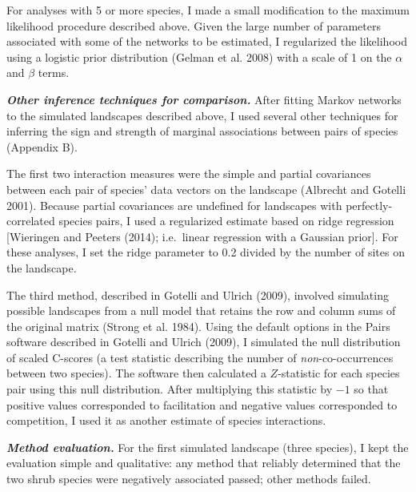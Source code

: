 \documentclass[12pt,]{article}
\begin{document}
\begin{spacing}{1.9}
\begin{flushleft}
For analyses with 5 or more species, I made a small modification to the
maximum likelihood procedure described above. Given the large number of
parameters associated with some of the networks to be estimated, I
regularized the likelihood using a logistic prior distribution (Gelman
et al. 2008) with a scale of 1 on the \(\alpha\) and \(\beta\) terms.

\textbf{\emph{Other inference techniques for comparison.}} After fitting
Markov networks to the simulated landscapes described above, I used
several other techniques for inferring the sign and strength of marginal
associations between pairs of species (Appendix B).

The first two interaction measures were the simple and partial
covariances between each pair of species' data vectors on the landscape
(Albrecht and Gotelli 2001). Because partial covariances are undefined
for landscapes with perfectly-correlated species pairs, I used a
regularized estimate based on ridge regression {[}Wieringen and Peeters
(2014); i.e.~linear regression with a Gaussian prior{]}. For these
analyses, I set the ridge parameter to 0.2 divided by the number of
sites on the landscape.

The third method, described in Gotelli and Ulrich (2009), involved
simulating possible landscapes from a null model that retains the row
and column sums of the original matrix (Strong et al. 1984). Using the
default options in the Pairs software described in Gotelli and Ulrich
(2009), I simulated the null distribution of scaled C-scores (a test
statistic describing the number of \emph{non}-co-occurrences between two
species). The software then calculated a \(Z\)-statistic for each
species pair using this null distribution. After multiplying this
statistic by \(-1\) so that positive values corresponded to facilitation
and negative values corresponded to competition, I used it as another
estimate of species interactions.

\textbf{\emph{Method evaluation.}} For the first simulated landscape
(three species), I kept the evaluation simple and qualitative: any
method that reliably determined that the two shrub species were
negatively associated passed; other methods failed.


\end{flushleft}
\end{spacing}
\end{document}
